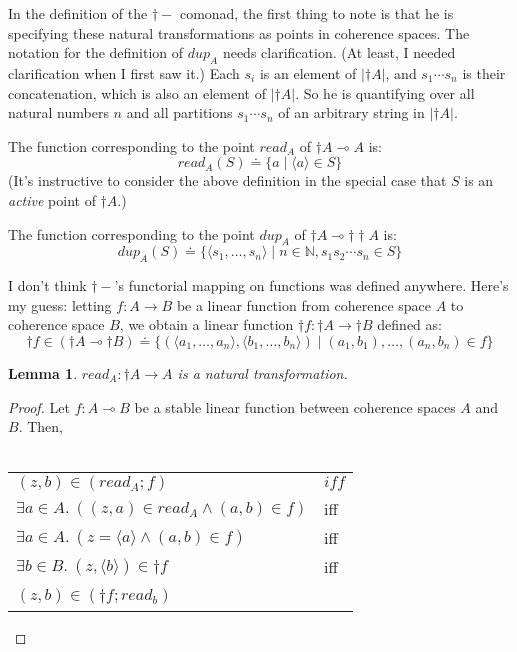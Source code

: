 \documentclass{article}
\newtheorem{lemma}{Lemma}
\begin{document}
In the definition of the $\dagger-$ comonad, the first thing to note is that he is specifying these natural transformations as points in coherence spaces. The notation for the definition of $\mathit{dup}_A$ needs clarification. (At least, I needed clarification when I first saw it.) Each $s_i$ is an element of $| \dagger A |$, and $s_1 \cdots s_n$ is their concatenation, which is also an element of $| \dagger A|$. So he is quantifying over all natural numbers $n$ and all partitions $s_1 \cdots s_n$ of an arbitrary string in $| \dagger A|$.

The function corresponding to the point $\mathit{read}_A$ of 
$\dagger A \multimap A$ is:
$$\mathit{read_A}(S) \doteq \{ a \mid \langle a \rangle \in S \}$$
(It's instructive to consider the above definition in the special case that $S$ is an \emph{active} point of $\dagger A$.)

The function corresponding to the point $\mathit{dup}_A$ of $\dagger A \multimap \dagger \dagger A$ is:
$$\mathit{dup}_A(S) \doteq \{ \langle s_1,\ldots,s_n \rangle \mid n \in \mathbb N, s_1 s_2 \cdots s_n \in S \} $$

I don't think $\dagger -$'s functorial mapping on functions was defined anywhere. Here's my guess: letting $f : A \to B$ be a linear function from coherence space $A$ to coherence space $B$, we obtain a linear function $\dagger f : \dagger A \to \dagger B$ defined as:
$$\dagger f \in (\dagger A \multimap \dagger B) \doteq \{ ( \langle a_1,\ldots,a_n \rangle, \langle b_1, \ldots, b_n \rangle)  \mid (a_1,b_1),\ldots,(a_n,b_n) \in f \}$$
 
\begin{lemma}
$\mathit{read_A} : \dagger A \to A$ is a natural transformation.
\end{lemma}

\begin{proof}
Let $f : A \multimap B$ be a stable linear function between coherence spaces $A$ and $B$. Then,\\~\\
\begin{tabular}{ll}
$(z,b) \in (\mathit{read}_A;f)$ & $\mathit{iff}$ \\
$\exists a \in A.~((z,a) \in \mathit{read}_A \wedge (a,b) \in f) $ & iff \\
$\exists a \in A.~(z = \langle a \rangle \wedge (a,b) \in f)$ & iff \\

$\exists b \in B.~(z,\langle b \rangle) \in \dagger f$ & iff \\
$(z,b) \in (\dagger f;\mathit{read}_b)$ & ~ 
\end{tabular} 
\end{proof}
\end{document}
